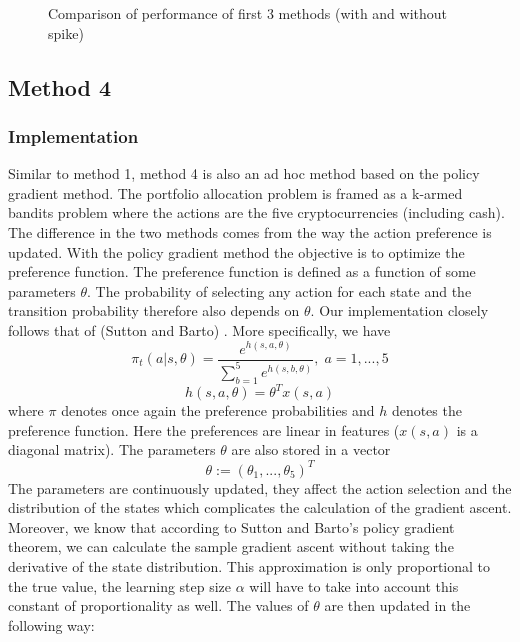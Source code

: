 \documentclass[a4paper,12pt]{article}
\begin{document}
\begin{figure}[h!]
\begin{subfigure}[b]{0.4\linewidth}
  \end{subfigure}
  \caption{Comparison of performance of first 3 methods (with and without spike)}
  \label{fig:comparison}
\end{figure}

\subsection{Method 4}

\subsubsection{Implementation}
Similar to method 1, method 4 is also an ad hoc method based on the policy gradient method. The portfolio allocation problem is framed as a k-armed bandits problem where the actions are the five cryptocurrencies (including cash). The difference in the two methods comes from the way the action preference is updated.  With the policy gradient method the objective is to optimize the preference function. The preference function is defined as a function of some parameters $\theta$. The probability of selecting any action for each state and the transition probability therefore also depends on $\theta$. Our implementation closely follows that of (Sutton and Barto) \cite{sutton}. More specifically, we have
\begin{equation}
\pi_t (a|s,\theta)  = \frac{e^{h(s,a,\theta)}}{\sum_{b=1}^{5} e^{h(s,b,\theta)}}, \; a=1,...,5
\end{equation}
\begin{equation}
h(s,a,\theta) = \theta^T x(s,a)
\end{equation}
where $\pi$ denotes once again the preference probabilities and $h$ denotes the preference function. Here the preferences are linear in features ($x(s,a)$ is a diagonal matrix). The parameters $\theta$ are also stored in a vector
\begin{equation}
\theta := (\theta_1,...,\theta_5)^T
\end{equation}
The parameters are continuously updated, they affect the action selection and the distribution of the states which complicates the calculation of the gradient ascent. Moreover, we know that according to Sutton and Barto's policy gradient theorem, we can calculate the sample gradient ascent without taking the derivative of the state distribution. This approximation is only proportional to the true value, the learning step size $\alpha$ will have to take into account this constant of proportionality as well. The values of $\theta$ are then updated in the following way:
\end{document}
